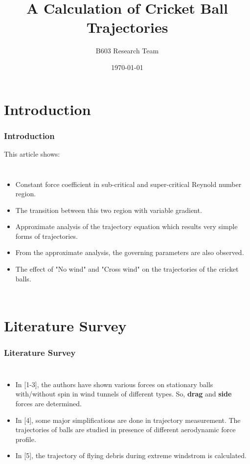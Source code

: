 \documentclass{beamer}
\title{A Calculation of Cricket Ball Trajectories}
\author{B603 Research Team}
\institute{Indian Institute of Technology, Hyderabad.}
\date{\today}
\begin{document}
\begin{frame}
\titlepage
\end{frame}
\section{Introduction}
\begin{frame}
\frametitle{Introduction}
This article shows:\\
\begin{columns}
  \begin{itemize}
  \item Constant force coefficient in sub-critical and super-critical Reynold number region.
  \item The transition between this two region with variable gradient.
  \item Approximate analysis of the trajectory equation which results very simple forms of trajectories.
  \item From the approximate analysis, the governing parameters are also observed.
  \item The effect of "No wind" and "Cross wind" on the trajectories of the cricket balls.
  \end{itemize}
\end{columns}

\end{frame}


\section{Literature Survey}
\begin{frame}
\frametitle{Literature Survey}
\begin{columns}
  \begin{itemize}
  \item In [1-3], the authors have shown various forces on stationary balls with/without spin in wind tunnels of different types. So, \textbf{drag} and \textbf{side} forces are determined.
  \item In [4], some major simplifications are done in trajectory measurement. The trajectories of balls are studied in presence of different aerodynamic force profile.
  \item In [5], the trajectory of flying debris during extreme windstrom is calculated.
  
  \end{itemize}
\end{columns}

\end{frame}
\end{document}
